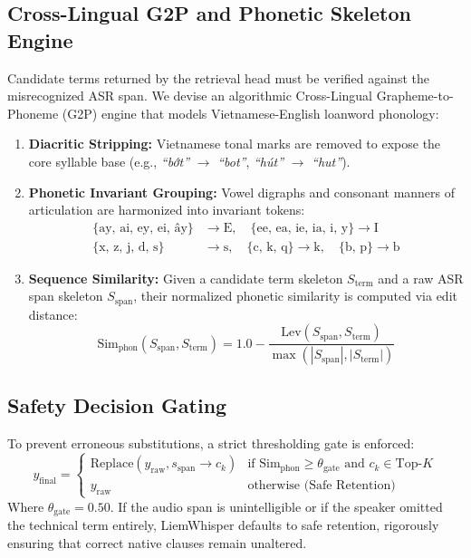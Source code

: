 \documentclass[11pt,conference,onecolumn]{IEEEtran}
\begin{document}
\subsection{Cross-Lingual G2P and Phonetic Skeleton Engine}
Candidate terms returned by the retrieval head must be verified against the misrecognized ASR span. We devise an algorithmic Cross-Lingual Grapheme-to-Phoneme (G2P) engine that models Vietnamese-English loanword phonology:
\begin{enumerate}
    \item \textbf{Diacritic Stripping:} Vietnamese tonal marks are removed to expose the core syllable base (e.g., \textit{``bớt''} $\to$ \textit{``bot''}, \textit{``hút''} $\to$ \textit{``hut''}).
    \item \textbf{Phonetic Invariant Grouping:} Vowel digraphs and consonant manners of articulation are harmonized into invariant tokens:
    \begin{align*}
        \{\text{ay, ai, ey, ei, ây}\} &\to \text{E}, \quad \{\text{ee, ea, ie, ia, i, y}\} \to \text{I} \\
        \{\text{x, z, j, d, s}\} &\to \text{s}, \quad \{\text{c, k, q}\} \to \text{k}, \quad \{\text{b, p}\} \to \text{b}
    \end{align*}
    \item \textbf{Sequence Similarity:} Given a candidate term skeleton $S_{\text{term}}$ and a raw ASR span skeleton $S_{\text{span}}$, their normalized phonetic similarity is computed via edit distance:
    \begin{equation}
    \text{Sim}_{\text{phon}}(S_{\text{span}}, S_{\text{term}}) = 1.0 - \frac{\text{Lev}(S_{\text{span}}, S_{\text{term}})}{\max(|S_{\text{span}}|, |S_{\text{term}}|)}
    \end{equation}
\end{enumerate}

\subsection{Safety Decision Gating}
To prevent erroneous substitutions, a strict thresholding gate is enforced:
\begin{equation}
y_{\text{final}} = \begin{cases} 
\text{Replace}(y_{\text{raw}}, s_{\text{span}} \to c_k) & \text{if } \text{Sim}_{\text{phon}} \ge \theta_{\text{gate}} \text{ and } c_k \in \text{Top-}K \\
y_{\text{raw}} & \text{otherwise (Safe Retention)}
\end{cases}
\end{equation}
Where $\theta_{\text{gate}} = 0.50$. If the audio span is unintelligible or if the speaker omitted the technical term entirely, LiemWhisper defaults to safe retention, rigorously ensuring that correct native clauses remain unaltered.
\end{document}
